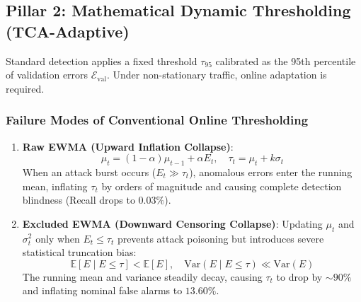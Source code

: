 \documentclass{ieeeaccess}
\begin{document}
\subsection{Pillar 2: Mathematical Dynamic Thresholding (TCA-Adaptive)}
Standard detection applies a fixed threshold $\tau_{95}$ calibrated as the 95th percentile of validation errors $\mathcal{E}_{\text{val}}$. Under non-stationary traffic, online adaptation is required.

\subsubsection{Failure Modes of Conventional Online Thresholding}
\begin{enumerate}
    \item \textbf{Raw EWMA (Upward Inflation Collapse)}:
    \begin{equation}
        \mu_t = (1 - \alpha)\mu_{t-1} + \alpha E_t, \quad \tau_t = \mu_t + k \sigma_t
    \end{equation}
    When an attack burst occurs ($E_t \gg \tau_t$), anomalous errors enter the running mean, inflating $\tau_t$ by orders of magnitude and causing complete detection blindness (Recall drops to $0.03\%$).
    \item \textbf{Excluded EWMA (Downward Censoring Collapse)}:
    Updating $\mu_t$ and $\sigma_t^2$ only when $E_t \le \tau_t$ prevents attack poisoning but introduces severe statistical truncation bias:
    \begin{equation}
        \mathbb{E}[E \mid E \le \tau] < \mathbb{E}[E], \quad \text{Var}(E \mid E \le \tau) \ll \text{Var}(E)
    \end{equation}
    The running mean and variance steadily decay, causing $\tau_t$ to drop by $\sim 90\%$ and inflating nominal false alarms to $13.60\%$.
\end{enumerate}
\end{document}
